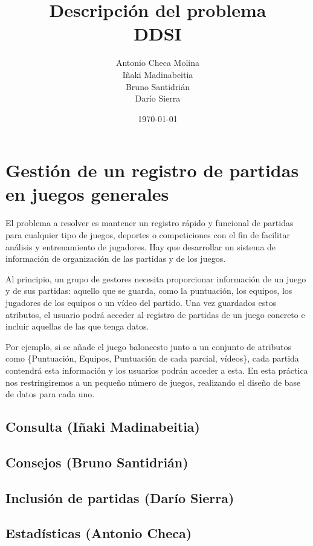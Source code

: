 \documentclass[a4paper, 11pt]{article}
\title{\Huge \textbf{Descripción del problema\\DDSI}}
\author{Antonio Checa Molina \\ Iñaki Madinabeitia \\ Bruno Santidrián \\ Darío Sierra}
\date{\today}
\begin{document}
\maketitle
\tableofcontents

\newpage
\section{Gestión de un registro de partidas en juegos generales}

El problema a resolver es mantener un registro rápido y funcional de partidas para cualquier tipo de juegos, deportes o competiciones con el fin de facilitar análisis y entrenamiento de jugadores. Hay que desarrollar un sistema de información de organización de las partidas y de los juegos.

Al principio, un grupo de gestores necesita proporcionar información de un juego y de sus partidas: aquello que se guarda, como la puntuación, los equipos, los jugadores de los equipos o un vídeo del partido. Una vez guardados estos atributos, el usuario podrá acceder al registro de partidas de un juego concreto e incluir aquellas de las que tenga datos.

Por ejemplo, si se añade el juego baloncesto junto a un conjunto de atributos como \{Puntuación, Equipos, Puntuación de cada parcial, vídeos\}, cada partida contendrá esta información y los usuarios podrán acceder a esta. En esta práctica nos restringiremos a un pequeño número de juegos, realizando el diseño de base de datos para cada uno.

\subsection{Consulta (Iñaki Madinabeitia)}


\subsection{Consejos (Bruno Santidrián)}


\subsection{Inclusión de partidas (Darío Sierra)}


\subsection{Estadísticas (Antonio Checa)}

\end{document}
